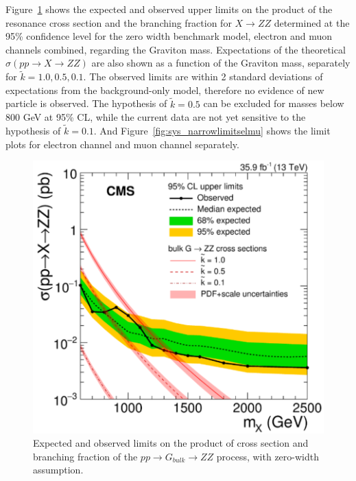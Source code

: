 \vspace{0.3cm}
Figure~\ref{fig:sys_narrowlimits} shows the expected and observed upper limits on the product of the resonance cross section and the branching fraction for $X\rightarrow ZZ$ determined at the 95\% confidence level for the zero width benchmark model, electron and muon channels combined, regarding the Graviton mass. Expectations of the theoretical $\sigma(pp\rightarrow X\rightarrow ZZ)$ are also shown as a function of the Graviton mass, separately for $\tilde{k}=1.0,0.5,0.1$. The observed limits are within 2 standard deviations of expectations from the background-only model, therefore no evidence of new particle is observed. The hypothesis of $\tilde{k}=0.5$ can be excluded for masses below 800 GeV at 95\% CL, while the current data are not yet sensitive to the hypothesis of $\tilde{k}=0.1$. And Figure~\ref{fig:sys_narrowlimitselmu} shows the limit plots for electron channel and muon channel separately.

\begin{figure}[htbp]
\begin{center}
\includegraphics[width=0.9\linewidth]{figures/sys_narrowlimit.png}
\caption{Expected and observed limits on the product of cross section and branching fraction of the $pp\rightarrow G_{bulk}\rightarrow ZZ$ process, with zero-width assumption.}
\label{fig:sys_narrowlimits}
\end{center}
\end{figure}

